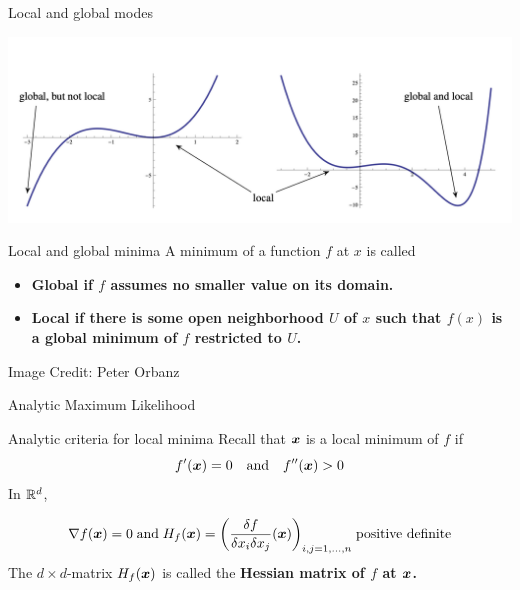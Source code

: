 \documentclass[10pt]{beamer}
\begin{document}
\begin{frame}{Local and global modes}

\begin{center}
\includegraphics[width=.8\textwidth]{images/types_of_minima}
\end{center}


\begin{sblock}{Local and global minima}
A minimum of a function $f$ at $x$ is called
\begin{itemize}
\item \bf{Global} if $f$ assumes no smaller value on its domain.
\item \bf{Local} if there is some open neighborhood $U$ of $x$ such that $f(x)$ is a global minimum of $f$ restricted to $U$.
\end{itemize}
\end{sblock}
\tiny \hfill Image Credit: Peter Orbanz
\end{frame}


\begin{frame}{Analytic Maximum Likelihood}



\begin{sblock}{Analytic criteria for local minima}
Recall that ${\boldsymbol x}$ is a local minimum of $f$ if
\[ f^\prime({\boldsymbol x}) = 0 \quad \text{and} \quad  f^{\prime \prime}({\boldsymbol x}) > 0  \]
In $\mathbb{R}^d$,

\[ \nabla f ({\boldsymbol x})  = 0 \; \text{and} \; H_f ({\boldsymbol x}) = \bigg( {\displaystyle\frac{\delta f}{\delta  x_i  \delta x_j}  ({\boldsymbol x}) } \bigg)_{ i,j= 1,...,n}   \; \text{positive definite} \]  
The $d \times  d$-matrix $H_f ({\boldsymbol x})$ is called the \bf{Hessian matrix} of $f$ at ${\boldsymbol x}$.
\end{sblock}

\end{frame}
\end{document}
